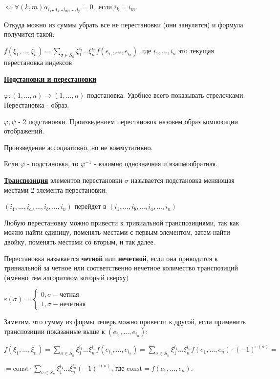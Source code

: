 \documentclass[twoside]{book}
\newcommand{\deff}[1]{\underline{\textbf{#1}}}
\begin{document}
\(\Leftrightarrow \forall (k,m) \alpha_{i_1 \ldots i_k \ldots i_m, \ldots, i_p}=0,\) если \(i_k = i_m\).


Откуда можно из суммы убрать все не перестановки (они занулятся) и формула получится такой:

\(f(\xi_1,\ldots,\xi_n) =  \sum\limits_{\sigma \in S_n} \xi_1^{i_1} \ldots \xi_n^{i_n} f(e_{i_1},\ldots,e_{i_n})\), где $i_1,\ldots,i_n$ это текущая перестановка индексов

\deff{Подстановки и перестановки}

\(\varphi: (1, \ldots,n) \rightarrow (1,\ldots,n)\) подстановка. Удобнее всего показывать стрелочками. Перестановка - образ.

\(\varphi, \psi\) - 2 подстановки. Произведением перестановок назовем образ композиции отображений.

Произведение ассоциативно, но не коммутативно.

Если $\varphi $ - подстановка, то $\varphi^{-1}$ - взаимно однозначная и взаимообратная.

\deff{Транспозиция} элементов перестановки \(\sigma\) называется подстановка меняющая местами 2 элемента перестановки:

\((i_1,\ldots,i_a,\ldots,i_b,\ldots,i_n)\)
перейдет в \((i_1,\ldots,i_b,\ldots,i_a,\ldots,i_n)\)

Любую перестановку можно привести к тривиальной транспозициями, так как можно найти единицу, поменять местами с первым элементом, затем найти двойку, поменять местами со вторым, и так далее.

Перестановка называется \textbf{четной} или \textbf{нечетной}, если она приводится к тривиальной за четное или соответственно нечетное количество транспозиций (именно тем алгоритмом который сверху)

\(\varepsilon(\sigma) = \begin{cases}
    0, \sigma - \text{четная} \\
    1, \sigma - \text{нечетная}
\end{cases}\)

Заметим, что сумму из формы теперь можно привести к другой, если применить транспозиции показанные выше к \((e_{i_1},\ldots,e_{i_n})\):

\(f(\xi_1,\ldots,\xi_n) =  \sum\limits_{\sigma \in S_n} \xi_1^{i_1} \ldots \xi_n^{i_n} f(e_{i_1},\ldots,e_{i_n}) = \sum\limits_{\sigma \in S_n} \xi_1^{i_1} \ldots \xi_n^{i_n} f(e_1,\ldots,e_n)\cdot (-1)^{\varepsilon(\sigma)} =\)

\(= \text{const} \cdot \sum\limits_{\sigma \in S_n} \xi_1^{i_1} \ldots \xi_n^{i_n} (-1)^{\varepsilon(\sigma)}\), где \(\text{const} = f(e_1,\ldots, e_n)\).
\end{document}
